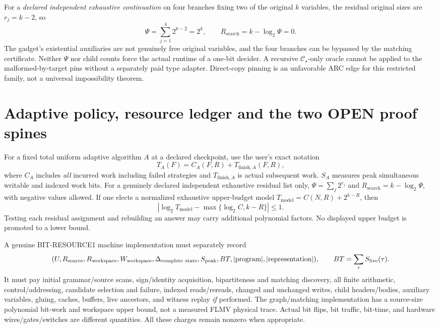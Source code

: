 \documentclass[11pt]{article}
\newcommand{\CS}{\mathcal C_\star}
\begin{document}
For a \emph{declared independent exhaustive continuation} on four branches fixing two of the original $k$ variables, the residual original sizes are $r_j=k-2$, so
\[
\Psi=\sum_{j=1}^4 2^{k-2}=2^k,\qquad
R_{\mathrm{search}}=k-\log_2\Psi=0.
\]
The gadget's existential auxiliaries are not genuinely free original variables, and the four branches can be bypassed by the matching certificate. Neither $\Psi$ nor child counts force the actual runtime of a one-bit decider. A recursive $\CS$-only oracle cannot be applied to the malformed-by-target pins without a separately paid type adapter. Direct-copy pinning is an unfavorable ARC edge for this restricted family, not a universal impossibility theorem.

\section{Adaptive policy, resource ledger and the two OPEN proof spines}
For a fixed total uniform adaptive algorithm $A$ at a declared checkpoint, use the user's exact notation
\[
T_A(F)=C_A(F,R)+T_{\mathrm{finish},A}(F,R),
\]
where $C_A$ includes \emph{all} incurred work including failed strategies and $T_{\mathrm{finish},A}$ is actual subsequent work. $S_A$ measures peak simultaneous writable and indexed work bits. For a genuinely declared independent exhaustive residual list only, $\Psi=\sum_j2^{r_j}$ and $R_{\mathrm{search}}=k-\log_2\Psi$, with negative values allowed. If one elects a normalized exhaustive upper-budget model $T_{\mathrm{model}}=C(N,R)+2^{k-R}$, then
\[
\left|\log_2T_{\mathrm{model}}-\max\{\log_2 C,k-R\}\right|\le1.
\]
Testing each residual assignment and rebuilding an answer may carry additional polynomial factors. No displayed upper budget is promoted to a lower bound.

A genuine BIT-RESOURCE1 machine implementation must separately record
\[
(U,R_{\rm source},R_{\rm workspace},W_{\rm workspace},
\Delta_{\rm complete\ state},S_{\rm peak},BT,
|\text{program}|,|\text{representation}|),
\qquad BT=\sum_\tau S_{\rm live}(\tau).
\]
It must pay initial grammar/source scans, sign/identity acquisition, bipartiteness and matching discovery, all finite arithmetic, control/addressing, candidate selection and failure, indexed reads/rereads, changed and unchanged writes, child headers/bodies, auxiliary variables, gluing, caches, buffers, live ancestors, and witness replay \emph{if} performed. The graph/matching implementation has a source-size polynomial bit-work and workspace upper bound, not a measured FLMV physical trace. Actual bit flips, bit traffic, bit-time, and hardware wires/gates/switches are different quantities. All these charges remain nonzero when appropriate.
\end{document}
